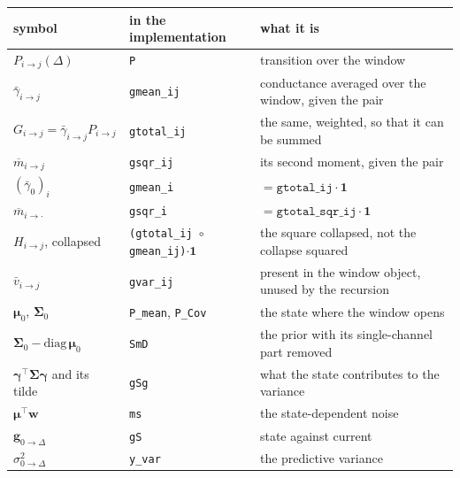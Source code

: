 \documentclass[11pt]{article}
\begin{document}
\begin{center}
\small
\begin{tabular}{@{}lll@{}}
\toprule
symbol & in the implementation & what it is \\
\midrule
$P_{i\to j}(\Delta)$ & \texttt{P} & transition over the window \\
$\bar{\gamma}_{i\to j}$ & \texttt{gmean\_ij} & conductance averaged over the window, given the pair \\
$G_{i\to j}=\bar{\gamma}_{i\to j}P_{i\to j}$ & \texttt{gtotal\_ij} & the same, weighted, so that it can be summed \\
$\overline{m}_{i\to j}$ & \texttt{gsqr\_ij} & its second moment, given the pair \\
$(\bar\gamma_0)_{i}$ & \texttt{gmean\_i} & $=\texttt{gtotal\_ij}\cdot\mathbf{1}$ \\
$\overline{m}_{i\to\cdot}$ & \texttt{gsqr\_i} & $=\texttt{gtotal\_sqr\_ij}\cdot\mathbf{1}$ \\
$H_{i\to j}$, collapsed & \texttt{(gtotal\_ij $\circ$ gmean\_ij)}$\cdot\mathbf{1}$ & the square collapsed, not the collapse squared \\
$\bar{v}_{i\to j}$ & \texttt{gvar\_ij} & present in the window object, unused by the recursion \\
$\bm{\mu}_0$, $\bm{\Sigma}_0$ & \texttt{P\_mean}, \texttt{P\_Cov} & the state where the window opens \\
$\bm{\Sigma}_0-\mathrm{diag}\,\bm{\mu}_0$ & \texttt{SmD} & the prior with its single-channel part removed \\
$\bm{\gamma}^\top\bm{\Sigma}\bm{\gamma}$ and its tilde & \texttt{gSg} & what the state contributes to the variance \\
$\bm{\mu}^\top\mathbf{w}$ & \texttt{ms} & the state-dependent noise \\
$\mathbf{g}_{0\to\Delta}$ & \texttt{gS} & state against current \\
$\sigma^2_{0\to\Delta}$ & \texttt{y\_var} & the predictive variance \\
\bottomrule
\end{tabular}
\end{center}
\end{document}
